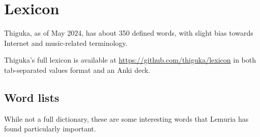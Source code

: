 
\chapter{Lexicon}
Thiguka, as of May 2024, has about 350 defined words, with slight bias towards Internet and music-related terminology.

Thiguka's full lexicon is available at \url{https://github.com/thiguka/lexicon} in both tab-separated values format and an Anki deck.



\newpage

\section{Word lists}
While not a full dictionary, these are some interesting words that Lemuria has found particularly important.






